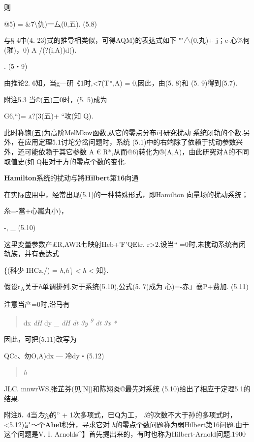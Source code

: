 \documentclass{article}
\begin{document}
则

@5) = \&7\textbackslash{}仇)一厶(0,五). (5.8)

与§ 4中(4. 23)式的推导相类似，可得AQM)的表达式如下 ""△(0,丸)+
j；e-心\%何(璀)，0) A /(?(i,A))d().

. (5・9)

由推论2. 6知，当g---研《1时,\textless{}7(T*,A) = 0,因此，由(5. 8)和 (5.
9)得到(5.7). \textbar{}

附注5.3 当©(五)三0时，(5. 5)成为

G6,``)= \textsc{a?(3(}五)+ ``攻(知 Q).

此时称饱(五)为高阶MelMkov函数,从它的零点分布可研究扰动
系统闭轨的个数.另外，在应用定理5.1讨坨分岔问题时，系统
(5.1)中的右端除了依赖于扰动参数兴外，还可能依赖于其它参数 A €
R*,从而@6)转化为®(A,A)，由此研究对A的不同取值史(如
Q相对于方的零点个数的变化.

\textbf{Hamilton}系统的扰动与將\textbf{Hilbert}第\textbf{16}向通

在实际应用中，经常出现(5.1)的一种特殊形式，即Hamilton 向量场的扰动系统；

糸=-當+心嵐丸小)，

-, \_ (5.10)

这里变量参数产£R,AWR七映射Heb+'F'QEtr, r\textgreater{}2.设当``
=0时,未搅动系统有闭轨族，并有表达式

\{(科少 IHCz,/) = \emph{h,h\textbackslash{} \textless{} h} \textless{}
知\}.

假设r\textsubscript{A}关于\emph{h}单调排列.对于系统(5.10),公式(5. 7)成为
心)=-赤」襄P+费加. (5.11)

注意当产=0时,沿马有

\begin{quote}
{dx} \emph{dH} dy \_ \emph{dH dt 3y \textsuperscript{9} dt 3x *}
\end{quote}

因此，可把(5.11)改写为

QCc、勿O,A)dx --- 冷dy・(5.12)

\begin{quote}
\emph{h}
\end{quote}

JLC. mnwrWS,张芷芬(见{[}N{]})和陈翔炎©最先对系统
(5.10)给出了相应于定理5.1的结果.

附注\textbf{5. 4}当\emph{为jy}的'' + 1次多项式，巳\textbf{Q}为工，
\emph{3}的次数不大于孙的多项式时，\textless{}5.12)是〜个\textbf{Abel}积分，寻求它对
\emph{h}的零点个数问题称为弱Hilbert第16问题.由于这个问题是V. I.
Arnolds\^{}】首先提出来的，有时也称为Hilbert-Arnold问题.1900
\end{document}
